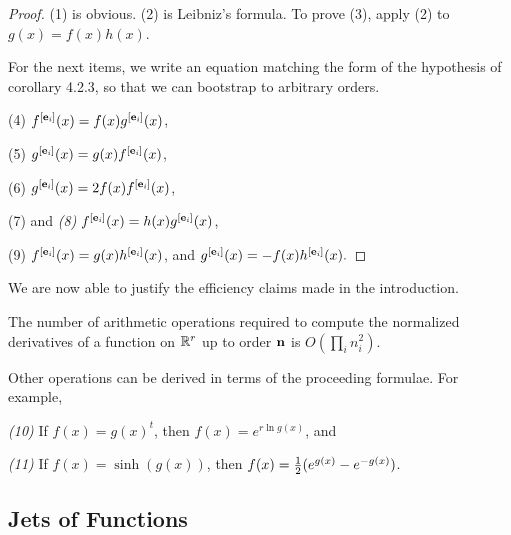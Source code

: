 \documentclass[11pt]{article}
\begin{document}
\begin{proof}
(1) is obvious.
(2) is Leibniz's formula.
To prove (3), apply (2) to $g(x)=f(x)h(x)$.

For the next items, we write an equation matching the form
of the hypothesis of {corollary 4.2.3}, so that we can bootstrap to arbitrary orders.

{(4)} $f^{[{\bf e}_{\it i}]}(x) = f(x) g^{[{\bf e}_{\it i}]}(x) $,

{(5)} $g^{[{\bf e}_{\it i}]}(x) = g(x) f^{[{\bf e}_{\it i}]}(x)$,

{(6)} $g^{[{\bf e}_{\it i}]}(x) = 2f(x) f^{[{\bf e}_{\it i}]}(x)$,

{(7)} and {\it (8)} $f^{[{\bf e}_{\it i}]}(x) = h(x) g^{[{\bf e}_{\it i}]}(x) $,

%

{(9)} $f^{[{\bf e}_{\it i}]}(x) = g(x) h^{[{\bf e}_{\it i}]}(x) $, and 
$g^{[{\bf e}_{\it i}]}(x) = -f(x) h^{[{\bf e}_{\it i}]}(x). $

\end{proof}

We are now able to justify the efficiency claims made in the introduction.

\begin{corollary}
The number of arithmetic operations required to compute the normalized derivatives
of a function on $\mathbb{R}^r$ up to order $\bf n$ is $O(\prod_i n_i^2).$
\end{corollary}

Other operations can be derived in terms of the proceeding formulae.
For example,

{\it (10)} If $ f(x) = g(x)^t $, then $ f(x)=e^{r\ln g(x)} $, and

{\it (11)} If $ f(x) = \sinh(g(x)) $, then $ f(x)={1\over 2}(e^{g(x)}-e^{-g(x)}) $.



\subsection{Jets of Functions} 
\end{document}
